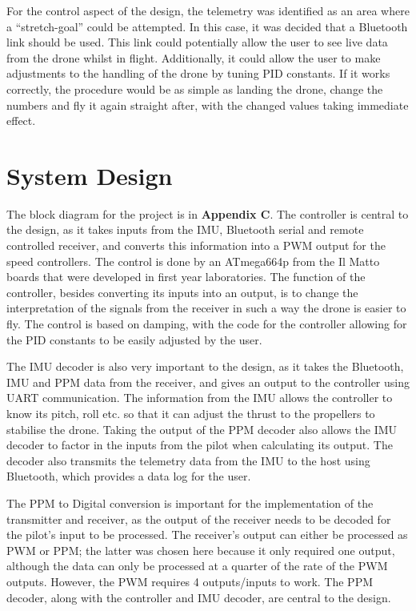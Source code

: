 \documentclass[a4paper]{article}
\begin{document}
For the control aspect of the design, the telemetry was identified as an area where a “stretch-goal” could be attempted. In this case, it was decided that a Bluetooth link should be used. This link could potentially allow the user to see live data from the drone whilst in flight. Additionally, it could allow the user to make adjustments to the handling of the drone by tuning PID constants. If it works correctly, the procedure would be as simple as landing the drone, change the numbers and fly it again straight after, with the changed values taking immediate effect.

\section{System Design}

The block diagram for the project is in \textbf{Appendix C}. The controller is central to the design, as it takes inputs from the IMU, Bluetooth serial and remote controlled receiver, and converts this information into a PWM output for the speed controllers. The control is done by an ATmega664p from the Il Matto boards that were developed in first year laboratories. The function of the controller, besides converting its inputs into an output, is to change the interpretation of the signals from the receiver in such a way the drone is easier to fly. The control is based on damping, with the code for the controller allowing for the PID constants to be easily adjusted by the user.

The IMU decoder is also very important to the design, as it takes the Bluetooth, IMU and PPM data from the receiver, and gives an output to the controller using UART communication. The information from the IMU allows the controller to know its pitch, roll etc. so that it can adjust the thrust to the propellers to stabilise the drone. Taking the output of the PPM decoder also allows the IMU decoder to factor in the inputs from the pilot when calculating its output. The decoder also transmits the telemetry data from the IMU to the host using Bluetooth, which provides a data log for the user.

The PPM to Digital conversion is important for the implementation of the transmitter and receiver, as the output of the receiver needs to be decoded for the pilot’s input to be processed. The receiver’s output can either be processed as PWM or PPM; the latter was chosen here because it only required one output, although the data can only be processed at a quarter of the rate of the PWM outputs. However, the PWM requires 4 outputs/inputs to work. The PPM decoder, along with the controller and IMU decoder, are central to the design.
\end{document}
